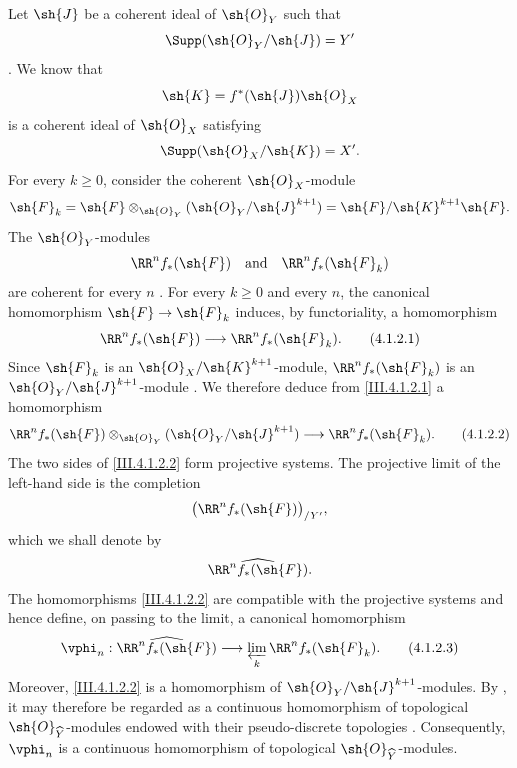 \begin{env}[4.1.2]
\label{III.4.1.2}
Let $\sh{J}$ be a coherent ideal of $\sh{O}_Y$ such that
\[
  \Supp(\sh{O}_Y/\sh{J})=Y'
\]
.
We know  that
\[
  \sh{K}=f^*(\sh{J})\sh{O}_X
\]
is a coherent ideal of $\sh{O}_X$ satisfying
\[
  \Supp(\sh{O}_X/\sh{K})=X'.
\]
For every $k\geq0$, consider the coherent $\sh{O}_X$-module
\[
  \sh{F}_k
  =
  \sh{F}\otimes_{\sh{O}_Y}(\sh{O}_Y/\sh{J}^{k+1})
  =
  \sh{F}/\sh{K}^{k+1}\sh{F}.
\]
The $\sh{O}_Y$-modules
\[
  \RR^n f_*(\sh{F})
  \quad\text{and}\quad
  \RR^n f_*(\sh{F}_k)
\]
are coherent for every $n$ .
For every $k\geq0$ and every $n$, the canonical homomorphism
$\sh{F}\to\sh{F}_k$ induces, by functoriality, a homomorphism
\[
  \RR^n f_*(\sh{F})
  \longrightarrow
  \RR^n f_*(\sh{F}_k).
  \tag{4.1.2.1}
  \label{III.4.1.2.1}
\]
Since $\sh{F}_k$ is an $\sh{O}_X/\sh{K}^{k+1}$-module,
$\RR^n f_*(\sh{F}_k)$ is an
$\sh{O}_Y/\sh{J}^{k+1}$-module .
We therefore deduce from \eqref{III.4.1.2.1} a homomorphism
\[
  \RR^n f_*(\sh{F})
  \otimes_{\sh{O}_Y}(\sh{O}_Y/\sh{J}^{k+1})
  \longrightarrow
  \RR^n f_*(\sh{F}_k).
  \tag{4.1.2.2}
  \label{III.4.1.2.2}
\]
The two sides of \eqref{III.4.1.2.2} form projective systems.
The projective limit of the left-hand side is the completion
\[
  \bigl(\RR^n f_*(\sh{F})\bigr)_{/Y'},
\]
which we shall denote by
\[
  \widehat{\RR^n f_*(\sh{F})}.
\]
The homomorphisms \eqref{III.4.1.2.2} are compatible with the projective
systems and hence define, on passing to the limit, a canonical
homomorphism
\[
  \vphi_n:
  \widehat{\RR^n f_*(\sh{F})}
  \longrightarrow
  \varprojlim_k\RR^n f_*(\sh{F}_k).
  \tag{4.1.2.3}
  \label{III.4.1.2.3}
\]
Moreover, \eqref{III.4.1.2.2} is a homomorphism of
$\sh{O}_Y/\sh{J}^{k+1}$-modules.
By , it may therefore be regarded as a continuous
homomorphism of topological $\sh{O}_{\widehat{Y}}$-modules endowed with
their pseudo-discrete topologies .
Consequently, $\vphi_n$ is a continuous homomorphism of topological
$\sh{O}_{\widehat{Y}}$-modules.
\end{env}

